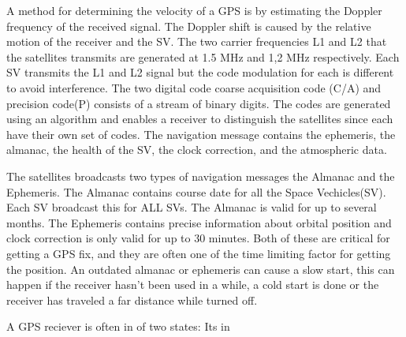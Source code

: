   
  
  A method for determining the velocity of a GPS is by estimating the Doppler frequency of the received signal. The Doppler shift is caused by the relative motion of the receiver and the SV. The two carrier frequencies L1 and L2 that the satellites transmits are generated at 1.5 MHz and 1,2 MHz respectively.  Each SV transmits the L1 and L2 signal but the code modulation for each is different to avoid interference. The two digital code coarse acquisition code (C/A) and precision code(P) consists of a stream of binary digits. The codes are generated using an algorithm and enables a receiver to distinguish the satellites since each have their own set of codes. The navigation message contains the ephemeris, the almanac, the health of the SV, the clock correction, and the atmospheric data. 
  
  
  
  
  The satellites broadcasts two types of navigation messages the Almanac and the Ephemeris. The Almanac contains course date for all the Space Vechicles(SV). Each SV broadcast this for ALL SVs. The Almanac is valid for up to several months. The Ephemeris contains precise information about orbital position and clock correction is only valid for up to 30 minutes. Both of these are critical for getting a GPS fix, and they are often one of the time limiting factor for getting the position. 
  An outdated almanac or ephemeris can cause a slow start, this can happen if the receiver hasn't been used in a while, a cold start is done or the receiver has traveled a far distance while turned off.
  
  A GPS reciever is often in of two states: Its in 
